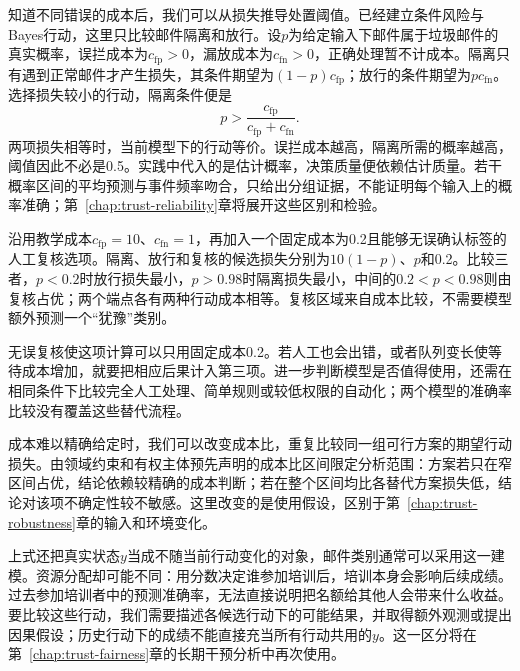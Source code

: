 知道不同错误的成本后，我们可以从损失推导处置阈值。已经建立条件风险与Bayes行动，这里只比较邮件隔离和放行。设$p$为给定输入下邮件属于垃圾邮件的真实概率，误拦成本为$c_{\mathrm{fp}}>0$，漏放成本为$c_{\mathrm{fn}}>0$，正确处理暂不计成本。隔离只有遇到正常邮件才产生损失，其条件期望为$(1-p)c_{\mathrm{fp}}$；放行的条件期望为$pc_{\mathrm{fn}}$。选择损失较小的行动，隔离条件便是
\begin{equation}
 p>\frac{c_{\mathrm{fp}}}{c_{\mathrm{fp}}+c_{\mathrm{fn}}}.
 \label{eq:trust-cost-threshold}
\end{equation}
两项损失相等时，当前模型下的行动等价。误拦成本越高，隔离所需的概率越高，阈值因此不必是0.5。实践中代入的是估计概率，决策质量便依赖估计质量。若干概率区间的平均预测与事件频率吻合，只给出分组证据，不能证明每个输入上的概率准确；第~\ref{chap:trust-reliability}章将展开这些区别和检验。

\begin{example}[增加复核选项后的决策]
\label{ex:trust-review-cost}
沿用教学成本$c_{\mathrm{fp}}=10$、$c_{\mathrm{fn}}=1$，再加入一个固定成本为0.2且能够无误确认标签的人工复核选项。隔离、放行和复核的候选损失分别为$10(1-p)$、$p$和0.2。比较三者，$p<0.2$时放行损失最小，$p>0.98$时隔离损失最小，中间的$0.2<p<0.98$则由复核占优；两个端点各有两种行动成本相等。复核区域来自成本比较，不需要模型额外预测一个“犹豫”类别。
\end{example}

无误复核使这项计算可以只用固定成本0.2。若人工也会出错，或者队列变长使等待成本增加，就要把相应后果计入第三项。进一步判断模型是否值得使用，还需在相同条件下比较完全人工处理、简单规则或较低权限的自动化；两个模型的准确率比较没有覆盖这些替代流程。

成本难以精确给定时，我们可以改变成本比，重复比较同一组可行方案的期望行动损失。由领域约束和有权主体预先声明的成本比区间限定分析范围：方案若只在窄区间占优，结论依赖较精确的成本判断；若在整个区间均比各替代方案损失低，结论对该项不确定性较不敏感。这里改变的是使用假设，区别于第~\ref{chap:trust-robustness}章的输入和环境变化。

上式还把真实状态$y$当成不随当前行动变化的对象，邮件类别通常可以采用这一建模。资源分配却可能不同：用分数决定谁参加培训后，培训本身会影响后续成绩。过去参加培训者中的预测准确率，无法直接说明把名额给其他人会带来什么收益。要比较这些行动，我们需要描述各候选行动下的可能结果，并取得额外观测或提出因果假设；历史行动下的成绩不能直接充当所有行动共用的$y$。这一区分将在第~\ref{chap:trust-fairness}章的长期干预分析中再次使用。

